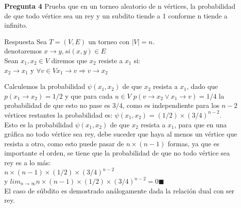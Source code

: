 \documentclass[12pt]{article}
\begin{document}
\lstset{language=python}
\begin{itemize}

\item[\bf{Pregunta 4}] Prueba que en un torneo aleatorio de n vértices, la probabilidad de que todo vértice sea un rey y un subdito tiende a 1 conforme n tiende a infinito.

\item[Respuesta] 
Sea $T=(V,E)$ un torneo con $|V|=n$.\\ 
denotaremos $x \rightarrow  y, si (x,y)\in E$\\

Sean $x_1,x_2 \in V$  diremos que $x_2$ resiste a $x_1 $ si:\\ $x_2 \rightarrow x_1$ y $\forall v \in V x_1 \rightarrow  v \Rightarrow v \rightarrow x_2$

Calculemos la probabilidad $\psi(x_1,x_2)$ de que $x_2$ resista a $x_1$, dado que $p(x_1 \rightarrow x_2)=1/2$ y que para cada $u \in V$  $ p(v\rightarrow x_2 \vee x_1\rightarrow v )=1/4$ la probabilidad de que esto no pase es $3/4$, como es independiente para los $n-2$ vértices restantes la probabilidad es: $\psi(x_1,x_2)=(1/2)\times(3/4)^{n-2}$.\\
Esto es la probabilidad $\psi(x_1,x_2)$ de que $x_2$ resista a $x_1$, para que en una gráfica no todo vértice sea rey, debe suceder que haya al menos un vértice que resista a otro, como esto puede pasar de $n\times(n-1)$ formas, ya que es importante el orden, se tiene que la probabilidad de que no todo vértice sea rey es a lo más:\\
$n\times(n-1)\times(1/2)\times(3/4)^{n-2}$\\

y $lim_{n\to\infty} n\times(n-1)\times(1/2)\times(3/4)^{n-2} = 0 \blacksquare$\\

El caso de súbdito es demostrado análogamente dada la relación dual con ser rey.
\end{itemize}
\end{document}
